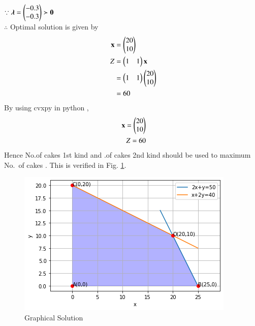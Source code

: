 $\because \boldsymbol{\lambda}=\begin{pmatrix}-0.3 \\ -0.3\end{pmatrix} \succ \mathbf{0} $
\\
$\therefore$ Optimal solution is given by
\begin{align}
    \vec{x} &= \myvec{20\\10} \\
    Z &= \myvec{1& 1}\vec{x} \\
    &= \myvec{1 & 1}\myvec{20 \\ 10} \\
    &= 60
\end{align}
By using cvxpy in python ,
\begin{align}
    \vec{x}=\myvec{20\\10}\\
    Z = 60
\end{align}
Hence No.of cakes  1st kind and  .of cakes  2nd kind should be used to maximum No. of cakes .  This is
verified in Fig. \ref{opt/13/fig: Graphical Solution}.	
%
\begin{figure}[!ht]
\centering
\includegraphics[width=\columnwidth]{solutions/su2021/2/13/Figure9.png}
\caption{Graphical Solution}
\label{opt/13/fig: Graphical Solution}	
\end{figure}
